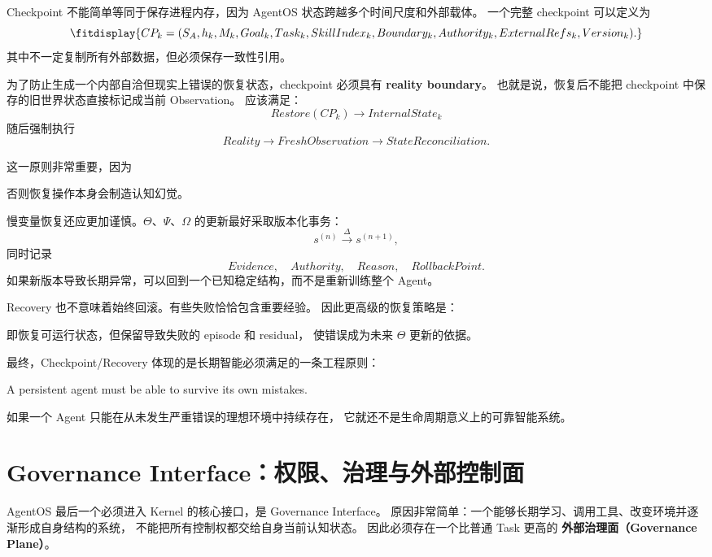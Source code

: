 Checkpoint 不能简单等同于保存进程内存，因为 AgentOS 状态跨越多个时间尺度和外部载体。
一个完整 checkpoint 可以定义为
\[
\fitdisplay{
CP_k=
(
S_A,
h_k,
M_k,
Goal_k,
Task_k,
SkillIndex_k,
Boundary_k,
Authority_k,
ExternalRefs_k,
Version_k
).
}
\]
其中不一定复制所有外部数据，但必须保存一致性引用。

为了防止生成一个内部自洽但现实上错误的恢复状态，checkpoint 必须具有
\textbf{reality boundary}。
也就是说，恢复后不能把 checkpoint 中保存的旧世界状态直接标记成当前 Observation。
应该满足：
\[
Restore(CP_k)
\rightarrow
InternalState_k
\]
随后强制执行
\[
Reality
\rightarrow
FreshObservation
\rightarrow
StateReconciliation.
\]

这一原则非常重要，因为
\begin{statementbox}
\centering
{}
\end{statementbox}
否则恢复操作本身会制造认知幻觉。

慢变量恢复还应更加谨慎。$\Theta$、$\Psi$、$\Omega$ 的更新最好采取版本化事务：
\[
s^{(n)}
\xrightarrow{\Delta}
s^{(n+1)},
\]
同时记录
\[
Evidence,\quad
Authority,\quad
Reason,\quad
RollbackPoint.
\]
如果新版本导致长期异常，可以回到一个已知稳定结构，而不是重新训练整个 Agent。

Recovery 也不意味着始终回滚。有些失败恰恰包含重要经验。
因此更高级的恢复策略是：
\begin{statementbox}
\centering
{}
\end{statementbox}
即恢复可运行状态，但保留导致失败的 episode 和 residual，
使错误成为未来 $\Theta$ 更新的依据。

最终，Checkpoint/Recovery 体现的是长期智能必须满足的一条工程原则：
\begin{proposition*}
A persistent agent must be able to survive its own mistakes.
\end{proposition*}
如果一个 Agent 只能在从未发生严重错误的理想环境中持续存在，
它就还不是生命周期意义上的可靠智能系统。


\section{Governance Interface：权限、治理与外部控制面}

AgentOS 最后一个必须进入 Kernel 的核心接口，是 Governance Interface。
原因非常简单：一个能够长期学习、调用工具、改变环境并逐渐形成自身结构的系统，
不能把所有控制权都交给自身当前认知状态。
因此必须存在一个比普通 Task 更高的
\textbf{外部治理面（Governance Plane）}。

